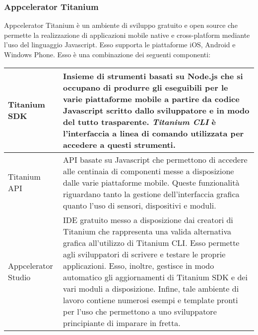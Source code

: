 			\subsubsection{Appcelerator Titanium}
				Appcelerator Titanium è un ambiente di sviluppo gratuito e open source che permette la realizzazione di applicazioni
				mobile native e cross-platform mediante l'uso del linguaggio Javascript. Esso supporta le piattaforme iOS, Android e
				Windows Phone. 
				Esso è una combinazione dei seguenti componenti:
				\begin{center}
					\begin{tabular}[H]{p{} p{}}
						Titanium SDK 			& Insieme di strumenti basati su Node.js che si occupano di produrre
										  gli eseguibili per le varie piattaforme mobile a partire da codice
										  Javascript scritto dallo sviluppatore e in modo del tutto
										  trasparente. \emph{Titanium CLI} è l'interfaccia a linea di
										  comando utilizzata per accedere a questi strumenti.\\
						\hline
						Titanium API			& API basate su Javascript che permettono di accedere alle centinaia
										  di componenti	messe a disposizione dalle varie piattaforme mobile.
										  Queste funzionalità riguardano tanto la gestione dell'interfaccia
										  grafica quanto l'uso di sensori, dispositivi e moduli.\\
						\hline
						Appcelerator Studio		& IDE gratuito messo a disposizione dai creatori di Titanium che
										  rappresenta una valida alternativa grafica all'utilizzo di 
										  Titanium CLI. Esso permette agli sviluppatori di scrivere e 
										  testare le proprie applicazioni. Esso, inoltre, gestisce in modo
										  automatico gli aggiornamenti di Titanium SDK e dei vari moduli a
										  disposizione. Infine, tale ambiente di lavoro contiene numerosi
										  esempi e template pronti per l'uso che permettono a uno
										  sviluppatore principiante di imparare in fretta.\\
					\end{tabular}
				\end{center}
